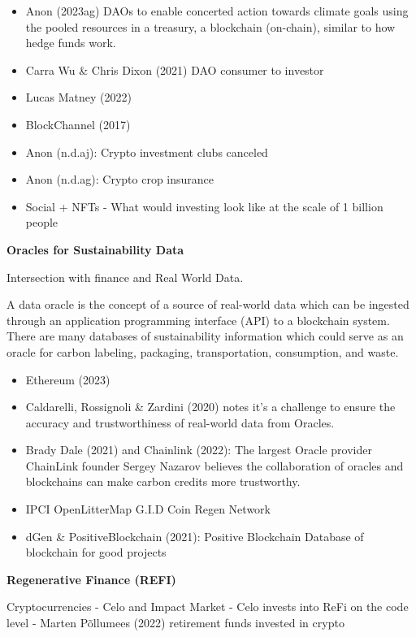\documentclass[
  letterpaper,
  DIV=11,
  numbers=noendperiod]{scrartcl}
\begin{document}
\begin{itemize}
\item
  Anon (2023ag) DAOs to enable concerted action towards climate goals
  using the pooled resources in a treasury, a blockchain (on-chain),
  similar to how hedge funds work.
\item
  Carra Wu \& Chris Dixon (2021) DAO consumer to investor
\item
  Lucas Matney (2022)
\item
  BlockChannel (2017)
\item
  Anon (n.d.aj): Crypto investment clubs canceled
\item
  Anon (n.d.ag): Crypto crop insurance
\item
  Social + NFTs - What would investing look like at the scale of 1
  billion people
\end{itemize}

\textbf{Oracles for Sustainability Data}

Intersection with finance and Real World Data.

A data oracle is the concept of a source of real-world data which can be
ingested through an application programming interface (API) to a
blockchain system. There are many databases of sustainability
information which could serve as an oracle for carbon labeling,
packaging, transportation, consumption, and waste.

\begin{itemize}
\item
  Ethereum (2023)
\item
  Caldarelli, Rossignoli \& Zardini (2020) notes it's a challenge to
  ensure the accuracy and trustworthiness of real-world data from
  Oracles.
\item
  Brady Dale (2021) and Chainlink (2022): The largest Oracle provider
  ChainLink founder Sergey Nazarov believes the collaboration of oracles
  and blockchains can make carbon credits more trustworthy.
\item
  IPCI OpenLitterMap G.I.D Coin Regen Network
\item
  dGen \& PositiveBlockchain (2021): Positive Blockchain Database of
  blockchain for good projects
\end{itemize}

\textbf{Regenerative Finance (REFI)}

Cryptocurrencies - Celo and Impact Market - Celo invests into ReFi on
the code level - Marten Põllumees (2022) retirement funds invested in
crypto
\end{document}
